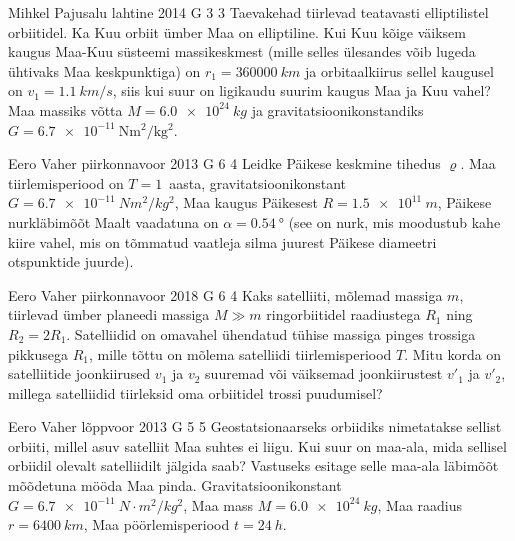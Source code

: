 \documentclass[11pt]{article}
\begin{document}
{%
{Mihkel Pajusalu} %
{lahtine} %
{2014} %
{G 3} %
{3} %
{
\ifStatement
Taevakehad tiirlevad teatavasti elliptilistel orbiitidel. Ka Kuu orbiit ümber Maa on elliptiline. Kui Kuu kõige väiksem kaugus Maa-Kuu süsteemi massikeskmest (mille selles ülesandes võib lugeda ühtivaks Maa keskpunktiga) on $r_{1}=\SI{360000}{km}$ ja orbitaalkiirus sellel kaugusel on $v_1=\SI{1.1}{km/s}$, siis kui suur on ligikaudu suurim kaugus Maa ja Kuu vahel? Maa massiks võtta $M=\SI{6.0e24}{kg}$ ja gravitatsioonikonstandiks $G=\SI{6.7e-11}{\newton\metre\squared\per\kilo\gram\squared}$.
\fi
}

{Eero Vaher} %
{piirkonnavoor} %
{2013} %
{G 6} %
{4} %
{
\ifStatement
Leidke Päikese keskmine tihedus $\varrho$. Maa
tiirlemisperiood on $T=1$~aasta, gravitatsioonikonstant 
$G=\SI{6.7e-11}{N m^2/kg^2}$, Maa kaugus Päikesest $R=\SI{1.5e11}{m}$, Päikese nurkläbimõõt Maalt vaadatuna on
$\alpha=\SI{0,54}{\degree}$ (see on nurk, mis moodustub kahe kiire vahel, mis on tõmmatud
vaatleja silma juurest Päikese diameetri otspunktide juurde).
\fi
}

{Eero Vaher} %
{piirkonnavoor} %
{2018} %
{G 6} %
{4} %
{
\ifStatement
Kaks satelliiti, mõlemad massiga $m$, tiirlevad ümber planeedi massiga $M\gg m$ ringorbiitidel raadiustega $R_1$ ning $R_2=2R_1$. Satelliidid on omavahel ühendatud tühise massiga pinges trossiga pikkusega $R_1$, mille tõttu on mõlema satelliidi tiirlemisperiood $T$. Mitu korda on satelliitide joonkiirused $v_1$ ja $v_2$ suuremad või väiksemad joonkiirustest $v'_1$ ja $v'_2$, millega satelliidid tiirleksid oma orbiitidel trossi puudumisel?
\fi
}

{Eero Vaher} %
{lõppvoor} %
{2013} %
{G 5} %
{5} %
{
\ifStatement
Geostatsionaarseks orbiidiks nimetatakse sellist orbiiti, millel asuv satelliit
Maa suhtes ei liigu. Kui suur on maa-ala, mida sellisel orbiidil olevalt
satelliidilt jälgida saab? Vastuseks esitage selle maa-ala läbimõõt mõõdetuna
mööda Maa pinda. Gravitatsioonikonstant $G=\SI{6.7e-11}{N \cdot m^2/kg^2}$, Maa
mass $M=\SI{6,0e24}{kg}$, Maa raadius $r=\SI{6400}{km}$, Maa
pöörlemisperiood $t=\SI{24}{h}$.
\fi
}
\newpage\subsection{\protect{}}

}
\end{document}
